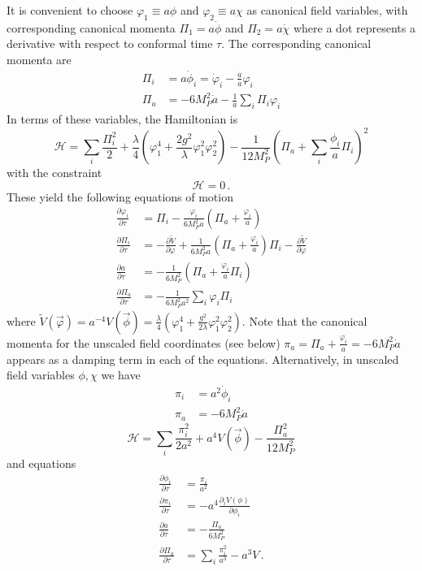 It is convenient to choose $\varphi_1 \equiv a\phi$ and $\varphi_2 \equiv a\chi$ as canonical field variables, with corresponding canonical momenta $\Pi_1 = a\dot{\phi}$ and $\Pi_2=a\dot{\chi}$ where a dot represents a derivative with respect to conformal time $\tau$.
The corresponding canonical momenta are
\begin{align}
  \Pi_i &= a\dot{\phi}_i = \dot{\varphi}_i - \frac{\dot{a}}{a}\varphi_i \\
  \Pi_a &= -6M_P^2\dot{a} - \frac{1}{a}\sum_i\Pi_i\varphi_i
\end{align}
In terms of these variables, the Hamiltonian is
\begin{equation}
  \mathcal{H} = \sum_i\frac{\Pi_i^2}{2} + \frac{\lambda}{4}\left(\varphi_1^4 + \frac{2g^2}{\lambda}\varphi_1^2\varphi_2^2 \right) - \frac{1}{12 M_P^2}\left(\Pi_a + \sum_i\frac{\phi_i}{a}\Pi_i\right)^2
\end{equation}
with the constraint
\begin{equation}
  \mathcal{H} = 0 \, .
\end{equation}
These yield the following equations of motion
\begin{align}\label{eqn:eom_scale}
  \frac{\partial\varphi_i}{\partial\tau} &= \Pi_i - \frac{\varphi_i}{6M_P^2a}\left(\Pi_a + \frac{\varphi_i}{a}\right) \\
  \frac{\partial\Pi_i}{\partial\tau}     &= -\frac{\partial\tilde{V}}{\partial\varphi} +\frac{1}{6M_P^2 a}\left(\Pi_a + \frac{\varphi_i}{a}\right)\Pi_i - \frac{\partial \tilde{V}}{\partial\varphi} \\
  \frac{\partial a}{\partial\tau}        &= -\frac{1}{6M_P^2}\left(\Pi_a + \frac{\varphi_i}{a}\Pi_i\right) \\
  \frac{\partial\Pi_a}{\partial\tau}     &= -\frac{1}{6M_P^2 a^2}\sum_i\varphi_i\Pi_i
\end{align}
where $\tilde{V}(\vec{\varphi}) = a^{-4}V(\vec{\phi}) = \frac{\lambda}{4}\left(\varphi_1^4 + \frac{g^2}{2\lambda}\varphi_1^2\varphi_2^2 \right)$.
Note that the canonical momenta for the unscaled field coordinates (see below) $\pi_a = \Pi_a + \frac{\varphi_i}{a} = -6M_P^2\dot{a}$ appears as a damping term in each of the equations.
Alternatively, in unscaled field variables $\phi,\chi$ we have
\begin{align}
  \pi_i &= a^2\dot{\phi}_i\\
  \pi_a &= -6M_P^2\dot{a} 
\end{align}
\begin{equation}
  \mathcal{H} = \sum_i\frac{\pi_i^2}{2a^2} + a^4V(\vec{\phi}) - \frac{\Pi_a^2}{12M_P^2}
\end{equation}
and equations
\begin{align}\label{eqn:eom_noscale}
  \frac{\partial\phi_i}{\partial\tau} &= \frac{\pi_i}{a^2} \\
  \frac{\partial\pi_i}{\partial\tau} &= -a^4 \frac{\partial_iV(\phi)}{\partial\phi_i} \\
  \frac{\partial a}{\partial\tau}     &= -\frac{\Pi_a}{6M_P^2} \\
  \frac{\partial\Pi_a}{\partial\tau}  &= \sum_i\frac{\pi_i^2}{a^3} - a^3V \, .
\end{align}

